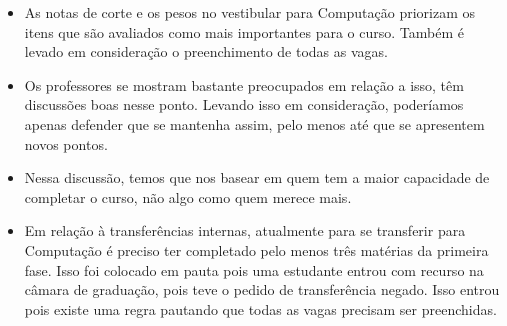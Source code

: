 \documentclass{ata-calico}
\begin{document}
\begin{itemize}
\item As notas de corte e os pesos no vestibular para Computação priorizam os itens que são avaliados como mais importantes para o curso. Também é levado em consideração o preenchimento de todas as vagas.
\item Os professores se mostram bastante preocupados em relação a isso, têm discussões boas nesse ponto. Levando isso em consideração, poderíamos apenas defender que se mantenha assim, pelo menos até que se apresentem novos pontos.
\item Nessa discussão, temos que nos basear em quem tem a maior capacidade de completar o curso, não algo como quem merece mais.
\item Em relação à transferências internas, atualmente para se transferir para Computação é preciso ter completado pelo menos três matérias da primeira fase. Isso foi colocado em pauta pois uma estudante entrou com recurso na câmara de graduação, pois teve o pedido de transferência negado. Isso entrou pois existe uma regra pautando que todas as vagas precisam ser preenchidas.
\end{itemize}

\end{document}
